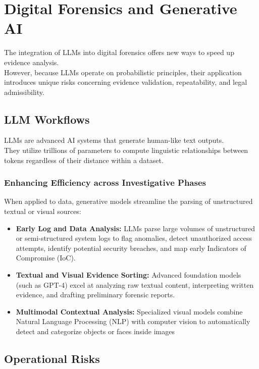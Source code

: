 \section{Digital Forensics and Generative AI}

The integration of LLMs into digital forensics offers new ways to speed up evidence analysis.\\
However, because LLMs operate on probabilistic principles, their application introduces unique risks concerning evidence validation, repeatability, and legal admissibility.

\subsection{LLM Workflows}

LLMs are advanced AI systems that generate human-like text outputs.\\
They utilize trillions of parameters to compute linguistic relationships between tokens regardless of their distance within a dataset.

\subsubsection*{Enhancing Efficiency across Investigative Phases}
When applied to data, generative models streamline the parsing of unstructured textual or visual sources:
\begin{itemize}
    \item \textbf{Early Log and Data Analysis:} LLMs parse large volumes of unstructured or semi-structured system logs to flag anomalies, detect unauthorized access attempts, identify potential security breaches, and map early Indicators of Compromise (IoC).
    \item \textbf{Textual and Visual Evidence Sorting:} Advanced foundation models (such as GPT-4) excel at analyzing raw textual content, interpreting written evidence, and drafting preliminary forensic reports.
    \item \textbf{Multimodal Contextual Analysis:} Specialized visual models combine Natural Language Processing (NLP) with computer vision to automatically detect and categorize objects or faces inside images
\end{itemize}

\subsection{Operational Risks}


